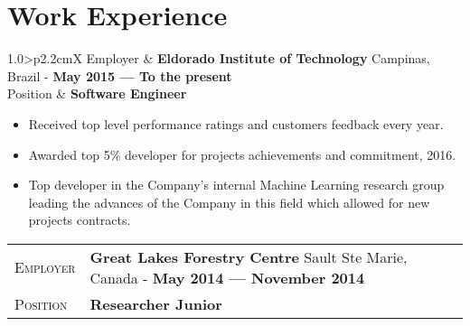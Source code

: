 \documentclass[9pt, a4paper, oneside, final]{scrartcl} %
\newcommand{\gray}{\rowcolor[gray]{.90}} %
\begin{document}


\section{Work Experience}

\begin{center}
\begin{tabularx}{1.0\linewidth}{>{\raggedleft\scshape}p{2.2cm}X}
\gray Employer & \textbf{Eldorado Institute of Technology} \hfill Campinas, Brazil - \textbf{May 2015 --- To the present}\\
\gray Position & \textbf{Software Engineer}\\
\end{tabularx}
\end{center}

\begin{itemize}\itemsep1.0pt \parskip1.5pt 

\item Received top level performance ratings and customers feedback every year.

\item Awarded top 5\% developer for projects achievements and commitment, 2016.


\item Top developer in the Company's internal Machine Learning research group leading the advances of the Company in this field which allowed for new projects contracts. 


\end{itemize}

\begin{center}
\begin{tabularx}{1.0\linewidth}{>{\raggedleft\scshape}p{2.2cm}X}
\gray Employer & \textbf{Great Lakes Forestry Centre } \hfill Sault Ste Marie, Canada - \textbf{May 2014 --- November 2014}\\
\gray Position & \textbf{Researcher Junior}\\
\end{tabularx}
\end{center}
\end{document}
